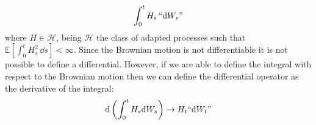 \begin{equation*}
    \int_0^t H_s\,``\dd W_s"
\end{equation*}
where $H\in\mathcal{H}$, being $\mathcal{H}$ the class of adapted processes such that $\mathbb{E}[\int_0^t H^2_s\,\dd s]<\infty$.
Since the Brownian motion is not differentiable it is not possible to define a differential. However, if we are able to define the integral with respect to the Brownian motion then we can define the differential operator as the derivative of the integral:
\begin{equation*}
    \dd\left(\int^t_0 H_s \dd W_s\right) \to H_t``\dd W_t"
\end{equation*}
